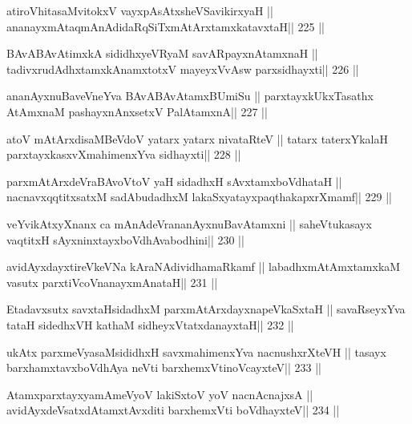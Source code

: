 \begin{shl}
atiroVhitasaMvitokxV vayxpAsAtxsheVSavikirxyaH ||
ananayxmAtaqmAnAdidaRqSiTxmAtArxtamxkatavxtaH\hfill || 225 ||
\end{shl}

\begin{shl}
BAvABAvAtimxkA sididhxyeVRyaM savAR\s payxnAtamxnaH ||
tadivxrudAdhxtamxkAnamxtotxV mayeyxVvAsw parxsidhayxti\hfill || 226 ||
\end{shl}

\begin{shl}
ananAyxnuBaveVneYva BAvABAvAtamxBUmiSu ||
parxtayxkUkxTasathx AtAmxnaM pashayxnAnxsetxV PalAtamxnA\hfill || 227 ||
\end{shl}

\begin{shl}
atoV mAtArxdisaMBeVdoV yatarx yatarx nivataRteV ||
tatarx taterxYkalaH parxtayxkasxvXmahimenxYva sidhayxti\hfill || 228 ||
\end{shl}

\begin{shl}
parxmAtArxdeVraBAvoV\s toV yaH sidadhxH sAvxtamxboVdhataH ||
nacnavxqqtitxsatxM sadAbudadhxM lakaSxyatayxpaqthakapxrXmamf\hfill || 229 ||
\end{shl}

\begin{shl}
veYvikAtxyXnanx ca mAnAdeVrananAyxnuBavAtamxni ||
saheVtukasayx vaqtitxH sAyxninxtayxboVdhAvabodhini\hfill || 230 ||
\end{shl}

\begin{shl}
avidAyxdayxtireVkeVNa kAraNAdividhamaRkamf ||
labadhxmAtAmxtamxkaM vasutx parxtiVcoV\s nanayxmAnataH\hfill || 231 ||
\end{shl}

\begin{shl}
Etadavxsutx savxtaHsidadhxM parxmAtArxdayxnapeVkaSxtaH ||
savaRseyxYva tataH sidedhxVH kathaM sidheyxVtatxdanayxtaH\hfill || 232 ||
\end{shl}

\begin{shl}
ukAtx parxmeVyasaMsididhxH savxmahimenxYva nacnushxrXteVH ||
tasayx barxhamxtavxboVdhAya neVti barxhemxVtinoVcayxteV\hfill || 233 ||
\end{shl}

\begin{shl}
AtamxparxtayxyamAmeVyoV lakiSxtoV yoV nacnA\s cnajxsA ||
avidAyxdeVsatxdAtamxtAvxditi barxhemxVti boVdhayxteV\hfill || 234 ||
\end{shl}

